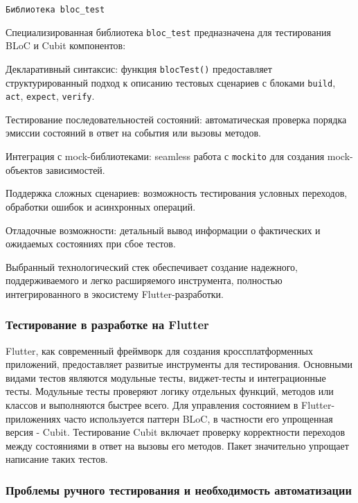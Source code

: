 \documentclass[14pt, russian]{scrartcl}
\begin{document}
\texttt{Библиотека bloc\_test} 

Специализированная библиотека \texttt{bloc\_test} предназначена для тестирования BLoC и Cubit компонентов:
\begin{itemize*}
    \item Декларативный синтаксис: функция \texttt{blocTest()} предоставляет структурированный подход к описанию тестовых сценариев с блоками \texttt{build}, \texttt{act}, \texttt{expect}, \texttt{verify}.
    \item Тестирование последовательностей состояний: автоматическая проверка порядка эмиссии состояний в ответ на события или вызовы методов.
    \item Интеграция с mock-библиотеками: seamless работа с \texttt{mockito} для создания mock-объектов зависимостей.
    \item Поддержка сложных сценариев: возможность тестирования условных переходов, обработки ошибок и асинхронных операций.
    \item Отладочные возможности: детальный вывод информации о фактических и ожидаемых состояниях при сбое тестов.
\end{itemize*}

Выбранный технологический стек обеспечивает создание надежного, поддерживаемого и легко расширяемого инструмента, полностью интегрированного в экосистему Flutter-разработки.


\subsubsection{Тестирование в разработке на Flutter}
Flutter, как современный фреймворк для создания кроссплатформенных приложений, предоставляет развитые инструменты для тестирования. Основными видами тестов являются модульные  тесты, виджет-тесты и интеграционные тесты. Модульные тесты проверяют логику отдельных функций, методов или классов и выполняются быстрее всего. Для управления состоянием в Flutter-приложениях часто используется паттерн BLoC, в частности его упрощенная версия - Cubit. Тестирование Cubit включает проверку корректности переходов между состояниями в ответ на вызовы его методов. Пакет  значительно упрощает написание таких тестов.

\subsubsection{Проблемы ручного тестирования и необходимость автоматизации}
\end{document}
